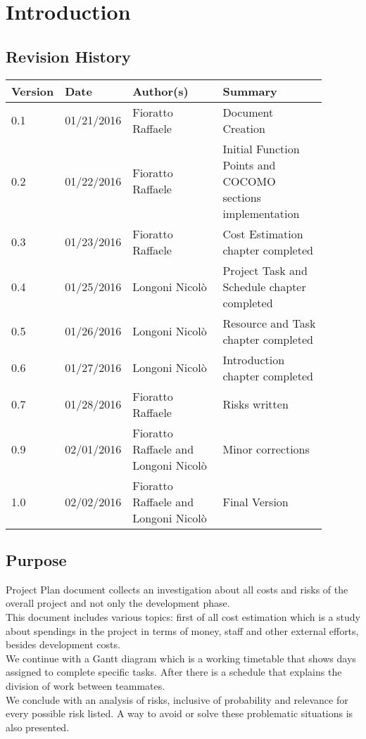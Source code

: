 \newpage
\section{Introduction}
\subsection{Revision History}
\begin{table}[H]
	\centering
	\begin{tabular*}{\linewidth}{|p{0.1\linewidth}|p{0.13\linewidth}|p{0.3099\linewidth}|p{0.3499\linewidth}|}
		\hline
		\textbf{Version} & \textbf{Date}       & \textbf{Author(s)}         & \textbf{Summary}           \\ \hline
		0.1     & 01/21/2016 & Fioratto Raffaele & Document Creation \\ \hline
		0.2     & 01/22/2016 & Fioratto Raffaele & Initial Function Points and COCOMO sections implementation \\ \hline
		0.3		& 01/23/2016 & Fioratto Raffaele &
		Cost Estimation chapter completed \\ \hline
		0.4 	& 01/25/2016 & Longoni Nicol\`{o} & Project Task and Schedule chapter completed \\ \hline
		0.5 	& 01/26/2016 & Longoni Nicol\`{o} & Resource and Task chapter completed \\ \hline
		0.6		& 01/27/2016 & Longoni Nicol\`{o} & Introduction chapter completed \\ \hline
		0.7		& 01/28/2016 & Fioratto Raffaele & Risks written \\ \hline
		0.9		& 02/01/2016 & Fioratto Raffaele and Longoni Nicol\`{o} & Minor corrections \\ \hline	
		1.0		& 02/02/2016 & Fioratto Raffaele and Longoni Nicol\`{o} & Final Version \\ \hline
	\end{tabular*}
\end{table}
\break
\subsection{Purpose}
Project Plan document collects an investigation about all costs and risks of the overall project and not only the development phase.\\
This document includes various topics: first of all cost estimation which is a study about spendings in the project in terms of money, staff and other external efforts, besides development costs.\\
We continue with a Gantt diagram which is a working timetable that shows days assigned to complete specific tasks. After there is a schedule that explains the division of work between teammates.\\
We conclude with an analysis of risks, inclusive of probability and relevance for every possible risk listed. A way to avoid or solve these problematic situations is also presented. 
